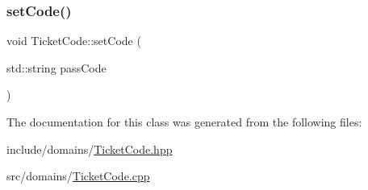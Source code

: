 \subsubsection{\texorpdfstring{setCode()}{setCode()}}
{\footnotesize\ttfamily void Ticket\+Code\+::set\+Code (\begin{DoxyParamCaption}\item[{std\+::string}]{pass\+Code }\end{DoxyParamCaption})}



The documentation for this class was generated from the following files\+:\begin{DoxyCompactItemize}
\item 
include/domains/\mbox{\hyperlink{_ticket_code_8hpp}{Ticket\+Code.\+hpp}}\item 
src/domains/\mbox{\hyperlink{_ticket_code_8cpp}{Ticket\+Code.\+cpp}}\end{DoxyCompactItemize}
